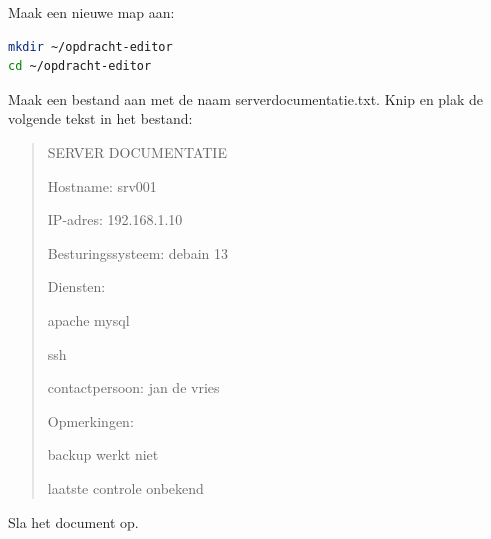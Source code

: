 Maak een nieuwe map aan:

\begin{lstlisting}[language=bash]
mkdir ~/opdracht-editor
cd ~/opdracht-editor
\end{lstlisting}

Maak een bestand aan met de naam serverdocumentatie.txt. Knip en plak de volgende tekst in het bestand:

\begin{quote}
SERVER DOCUMENTATIE


Hostname: srv001

IP-adres: 192.168.1.10

Besturingssysteem: debain 13


Diensten:

apache mysql

ssh

contactpersoon: jan de vries


Opmerkingen:

backup werkt niet

laatste controle onbekend
\end{quote}

Sla het document op.

